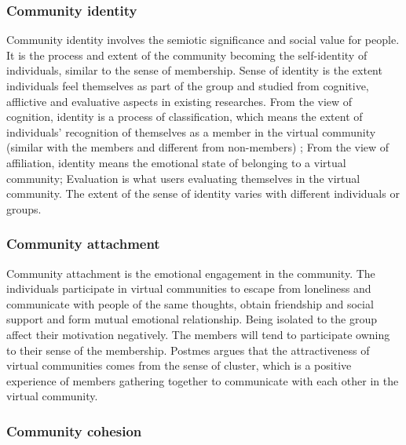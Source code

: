 \documentclass{elsarticle}
\begin{document}
\subsubsection{Community identity}
\label{sec:community-identiy}

Community identity involves the semiotic significance and social value
for people. It is the process and extent of the community becoming the
self-identity of individuals, similar to the sense of
membership. Sense of identity is the extent individuals feel
themselves as part of the group and studied from cognitive, afflictive
and evaluative aspects in existing
researches\cite{dholakia2004241}. From the view of cognition, identity
is a process of classification, which means the extent of
individuals’ recognition of themselves as a member in the virtual
community (similar with the members and different from non-members) ; From the view of affiliation, identity means the emotional state of belonging to a virtual community; Evaluation is what users evaluating themselves in the virtual community. The extent of the sense of identity varies with different individuals or groups\cite{warren1972ca}.     

\subsubsection{Community attachment}
\label{sec:community-attachment}

Community attachment is the emotional engagement in the community. The
individuals participate in virtual communities to escape from
loneliness and communicate with people of the same thoughts, obtain
friendship and social support and  form mutual emotional relationship.
Being isolated to the group affect their motivation negatively. The members will tend to participate owning to their sense of the membership. Postmes argues that the attractiveness of virtual communities comes from the sense of cluster, which is a positive experience of members gathering together to communicate with each other in the virtual community\cite{t_postmes_formation_2000}.     

\subsubsection{Community cohesion}
\label{sec:community-cohesion}
\end{document}
